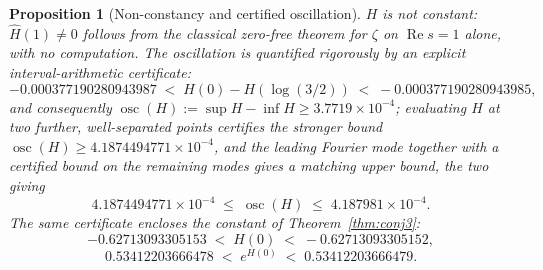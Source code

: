 \documentclass[11pt]{article}
\newtheorem{proposition}[theorem]{Proposition}
\theoremstyle{definition}
\theoremstyle{remark}
\begin{document}
\begin{proposition}[Non-constancy and certified oscillation]
\label{prop:Hcert}
$H$ is not constant: $\hat H(1)\ne0$ follows from the classical zero-free theorem for $\zeta$ on
$\operatorname{Re}s=1$ alone, with no computation. The oscillation is quantified rigorously by an
explicit interval-arithmetic certificate:
\[
-0.000377190280943987 \;<\; H(0) - H(\log(3/2)) \;<\; -0.000377190280943985,
\]
and consequently $\operatorname{osc}(H) := \sup H - \inf H \ge 3.7719\times 10^{-4}$; evaluating $H$
at two further, well-separated points certifies the stronger bound
$\operatorname{osc}(H) \ge 4.1874494771\times10^{-4}$, and the leading Fourier mode together with
a certified bound on the remaining modes gives a matching upper bound, the two giving
\[
4.1874494771\times10^{-4} \;\le\; \operatorname{osc}(H) \;\le\; 4.187981\times10^{-4}.
\]
The same certificate encloses the constant of Theorem~\ref{thm:conj3}:
\[
 -0.62713093305153 \;<\; H(0) \;<\; -0.62713093305152,
\]
\[
 0.53412203666478 \;<\; e^{H(0)} \;<\; 0.53412203666479 .
\]
\end{proposition}
\end{document}
